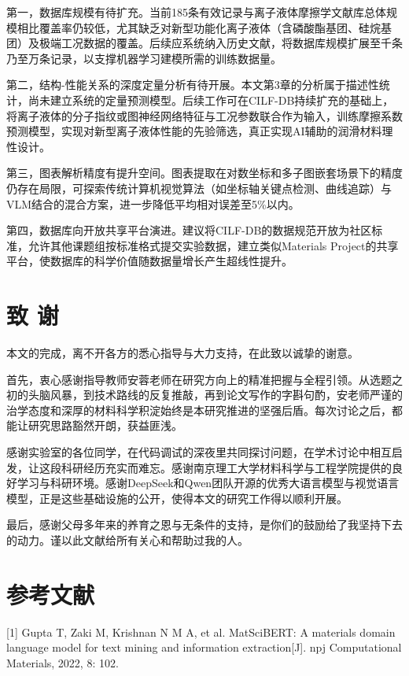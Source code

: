 第一，数据库规模有待扩充。当前185条有效记录与离子液体摩擦学文献库总体规模相比覆盖率仍较低，尤其缺乏对新型功能化离子液体（含磷酸酯基团、硅烷基团）及极端工况数据的覆盖。后续应系统纳入历史文献，将数据库规模扩展至千条乃至万条记录，以支撑机器学习建模所需的训练数据量。

第二，结构-性能关系的深度定量分析有待开展。本文第3章的分析属于描述性统计，尚未建立系统的定量预测模型。后续工作可在CILF-DB持续扩充的基础上，将离子液体的分子指纹或图神经网络特征与工况参数联合作为输入，训练摩擦系数预测模型，实现对新型离子液体性能的先验筛选，真正实现AI辅助的润滑材料理性设计。

第三，图表解析精度有提升空间。图表提取在对数坐标和多子图嵌套场景下的精度仍存在局限，可探索传统计算机视觉算法（如坐标轴关键点检测、曲线追踪）与VLM结合的混合方案，进一步降低平均相对误差至5\%以内。

第四，数据库向开放共享平台演进。建议将CILF-DB的数据规范开放为社区标准，允许其他课题组按标准格式提交实验数据，建立类似Materials Project的共享平台，使数据库的科学价值随数据量增长产生超线性提升。

\hypertarget{ux81f4-ux8c22}{%
\section{致 谢}\label{ux81f4-ux8c22}}

本文的完成，离不开各方的悉心指导与大力支持，在此致以诚挚的谢意。

首先，衷心感谢指导教师安蓉老师在研究方向上的精准把握与全程引领。从选题之初的头脑风暴，到技术路线的反复推敲，再到论文写作的字斟句酌，安老师严谨的治学态度和深厚的材料科学积淀始终是本研究推进的坚强后盾。每次讨论之后，都能让研究思路豁然开朗，获益匪浅。

感谢实验室的各位同学，在代码调试的深夜里共同探讨问题，在学术讨论中相互启发，让这段科研经历充实而难忘。感谢南京理工大学材料科学与工程学院提供的良好学习与科研环境。感谢DeepSeek和Qwen团队开源的优秀大语言模型与视觉语言模型，正是这些基础设施的公开，使得本文的研究工作得以顺利开展。

最后，感谢父母多年来的养育之恩与无条件的支持，是你们的鼓励给了我坚持下去的动力。谨以此文献给所有关心和帮助过我的人。

\hypertarget{ux53c2ux8003ux6587ux732e}{%
\section{参考文献}\label{ux53c2ux8003ux6587ux732e}}

{[}1{]} Gupta T, Zaki M, Krishnan N M A, et al. MatSciBERT: A materials domain language model for text mining and information extraction{[}J{]}. npj Computational Materials, 2022, 8: 102.

